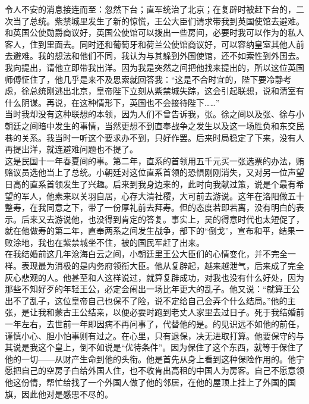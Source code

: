 令人不安的消息接连而至：忽然下台；直军统治了北京；在复辟时被赶下台的，二次当了总统。紫禁城里发生了新的惊慌，王公大臣们请求带我到英国使馆去避难。和英国公使勋爵商议好，英国公使馆可以拨出一些房间，必要时我可以作为的私人客人，住到里面去。同时还和葡萄牙和荷兰公使馆商议好，可以容纳皇室其他人前去避难。我的想法和他们不同，我认为与其躲到外国使馆，还不如索性到外国去。我向提出，请他立即带我出洋。因为我是突然之间把他找来提出的，所以这位英国师傅怔住了，他几乎是来不及思索就回答我：“这是不合时宜的，陛下要冷静考虑，徐总统刚逃出北京，皇帝陛下立刻从紫禁城失踪，这会引起联想，说和清室有什么阴谋。再说，在这种情形下，英国也不会接待陛下……”\\

当时我却没有这种联想的本领，因为人们不曾告诉我，张。徐之间以及张、徐与小朝廷之间暗中发生的事情，当然更想不到直奉战争之发生以及这一场胜负和东交民巷的关系。我当时一听这个要求办不到，只好作罢。后来时局稳定了下来，没有人再提出洋，就连避难问题也不提了。\\

这是民国十一年春夏间的事。第二年，直系的首领用五千元买一张选票的办法，贿赂议员选他当上了总统。小朝廷对这位直系首领的恐惧刚刚消失，又对另一位声望日高的直系首领发生了兴趣。后来到我身边来的，此时向我献过策，说是个最有希望的军人，他素来以关羽自居，心存大清社稷，大可前去游说。这年在洛阳做五十整寿，在我同意之下，带了一份厚礼前去拜寿。但的态度若即若离，没有明白的表示。后来又去游说他，也没得到肯定的答复。事实上，吴的得意时代也太短促了，就在他做寿的第二年，直奉两系之间发生战争，部下的“倒戈”，宣布和平，结果一败涂地，我也在紫禁城坐不住，被的国民军赶了出来。\\

在我结婚前这几年沧海白云之间，小朝廷里王公大臣们的心情变化，并不完全一样。表现最为消极的是内务府领衔大臣。他从复辟起，越来越泄气，后来成了完全灰心悲观的人。他甚至和人这样说过，就算复辟成功，对我也没有什么好处，因为那些不知好歹的年轻王公，必定会闹出一场比年更大的乱子。他又说：“就算王公出不了乱子，这位皇帝自己也保不了险，说不定给自己会弄个什么结局。”他的主张，是让我和蒙古王公结亲，以便必要时跑到老丈人家里去过日子。死于我结婚前一年左右，去世前一年即因病不再问事了，代替他的是。的见识远不如他的前任，谨慎小心、胆小怕事则有过之。在心里，只有退保，决无进取打算。他要保守的与其说是我这个皇上，倒不如说是“优待条件”。因为保住了这个东西，就等于保住了他的一切——从财产生命到他的头衔。他是首先从身上看到这种保险作用的。他宁愿把自己的空房子白给外国人住，也不收肯出高租的中国人为房客。自己不愿意领他这份情，帮忙给找了一个外国人做了他的邻居，在他的屋顶上挂上了外国的国旗，因此他对是感思不尽的。\\

